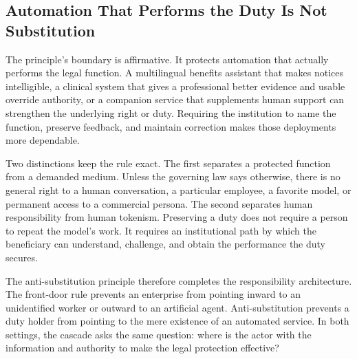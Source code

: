 \subsection{Automation That Performs the Duty Is Not Substitution}

The principle's boundary is affirmative. It protects automation that actually performs the legal function. A multilingual benefits assistant that makes notices intelligible, a clinical system that gives a professional better evidence and usable override authority, or a companion service that supplements human support can strengthen the underlying right or duty. Requiring the institution to name the function, preserve feedback, and maintain correction makes those deployments more dependable.

Two distinctions keep the rule exact. The first separates a protected function from a demanded medium. Unless the governing law says otherwise, there is no general right to a human conversation, a particular employee, a favorite model, or permanent access to a commercial persona. The second separates human responsibility from human tokenism. Preserving a duty does not require a person to repeat the model's work. It requires an institutional path by which the beneficiary can understand, challenge, and obtain the performance the duty secures.

The anti-substitution principle therefore completes the responsibility architecture. The front-door rule prevents an enterprise from pointing inward to an unidentified worker or outward to an artificial agent. Anti-substitution prevents a duty holder from pointing to the mere existence of an automated service. In both settings, the cascade asks the same question: where is the actor with the information and authority to make the legal protection effective?
